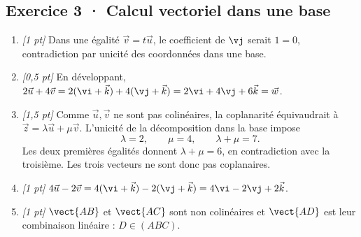 \subsection*{Exercice 3 · Calcul vectoriel dans une base}\begin{enumerate}

\item \textit{[1 pt]} Dans une égalité $\vec v=t\vec u$, le coefficient de $\vj $ serait $1=0$, contradiction par unicité des coordonnées dans une base.

\item \textit{[0,5 pt]} En développant, $2\vec u+4\vec v=2(\vi +\vec k)+4(\vj +\vec k)=2\vi +4\vj +6\vec k=\vec w$.

\item \textit{[1,5 pt]} Comme $\vec u,\vec v$ ne sont pas colinéaires, la coplanarité équivaudrait à $\vec z=\lambda\vec u+\mu\vec v$. L'unicité de la décomposition dans la base impose
\[\lambda=2,\qquad\mu=4,\qquad\lambda+\mu=7.\]
Les deux premières égalités donnent $\lambda+\mu=6$, en contradiction avec la troisième. Les trois vecteurs ne sont donc pas coplanaires.

\item \textit{[1 pt]} $4\vec u-2\vec v=4(\vi +\vec k)-2(\vj +\vec k)=4\vi -2\vj +2\vec k$.

\item \textit{[1 pt]} $\vect{AB}$ et $\vect{AC}$ sont non colinéaires et $\vect{AD}$ est leur combinaison linéaire : $D\in(ABC)$.

\end{enumerate}


